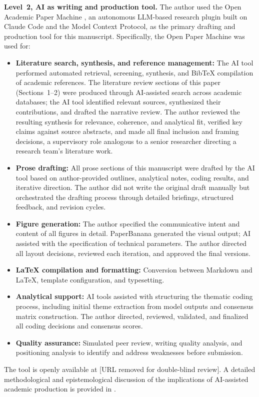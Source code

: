 \documentclass[preprint,review,12pt]{elsarticle}
\begin{document}
\textbf{Level~2, AI as writing and production tool.} The author used the Open Academic Paper Machine \citep{anonymized2026openpapermachine}, an autonomous LLM-based research plugin built on Claude Code and the Model Context Protocol, as the primary drafting and production tool for this manuscript. Specifically, the Open Paper Machine was used for:
\begin{itemize}
 \item \textbf{Literature search, synthesis, and reference management:} The AI tool performed automated retrieval, screening, synthesis, and BibTeX compilation of academic references. The literature review sections of this paper (Sections~1--2) were produced through AI-assisted search across academic databases; the AI tool identified relevant sources, synthesized their contributions, and drafted the narrative review. The author reviewed the resulting synthesis for relevance, coherence, and analytical fit, verified key claims against source abstracts, and made all final inclusion and framing decisions, a supervisory role analogous to a senior researcher directing a research team's literature work.
 \item \textbf{Prose drafting:} All prose sections of this manuscript were drafted by the AI tool based on author-provided outlines, analytical notes, coding results, and iterative direction. The author did not write the original draft manually but orchestrated the drafting process through detailed briefings, structured feedback, and revision cycles.
 \item \textbf{Figure generation:} The author specified the communicative intent and content of all figures in detail. PaperBanana \citep{zhu2026paperbanana} generated the visual output; AI assisted with the specification of technical parameters. The author directed all layout decisions, reviewed each iteration, and approved the final versions.
 \item \textbf{\LaTeX{} compilation and formatting:} Conversion between Markdown and \LaTeX{}, template configuration, and typesetting.
 \item \textbf{Analytical support:} AI tools assisted with structuring the thematic coding process, including initial theme extraction from model outputs and consensus matrix construction. The author directed, reviewed, validated, and finalized all coding decisions and consensus scores.
 \item \textbf{Quality assurance:} Simulated peer review, writing quality analysis, and positioning analysis to identify and address weaknesses before submission.
\end{itemize}
The tool is openly available at [URL removed for double-blind review]. A detailed methodological and epistemological discussion of the implications of AI-assisted academic production is provided in \citet{anonymized2026orchestrator}.
\end{document}
